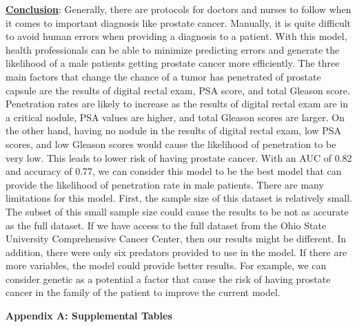 \documentclass[11pt]{article}\usepackage[]{graphicx}\usepackage[]{color}
\begin{document}
\noindent\textbf{\underline{Conclusion}}: Generally, there are protocols for doctors and nurses to follow when it comes to important diagnosis like prostate cancer. Manually, it is quite difficult to avoid human errors when providing a diagnosis to a patient. With this model, health professionals can be able to minimize predicting errors and generate the likelihood of a male patients getting prostate cancer more efficiently. The three main factors that change the chance of a tumor has penetrated of prostate capsule are the results of digital rectal exam, PSA score, and total Gleason score. Penetration rates are likely to increase as the results of digital rectal exam are in a critical nodule, PSA values are higher, and total Gleason scores are larger. On the other hand, having no nodule in the results of digital rectal exam, low PSA scores, and low Gleason scores would cause the likelihood of penetration to be very low. This leads to lower risk of having prostate cancer. With an AUC of 0.82 and accuracy of 0.77, we can consider this model to be the best model that can provide the likelihood of penetration rate in male patients. There are many limitations for this model. First, the sample size of this dataset is relatively small. The subset of this small sample size could cause the results to be not as accurate as the full dataset. If we have access to the full dataset from the Ohio State University Comprehensive Cancer Center, then our results might be different. In addition, there were only six predators provided to use in the model. If there are more variables, the model could provide better results. For example, we can consider genetic as a potential a factor that cause the risk of having prostate cancer in the family of the patient to improve the current model.         
\hfill \break

\clearpage
\newpage
\noindent \Large{{\bf Appendix A: Supplemental Tables}}
\end{document}
